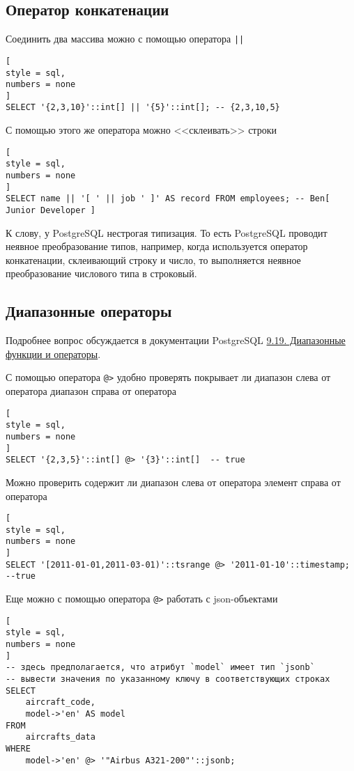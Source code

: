 \documentclass[%
	11pt,
	a4paper,
	utf8,
		]{article}
\begin{document}
\subsection{Оператор конкатенации}

Соединить два массива можно с помощью оператора \texttt{||} 
\begin{lstlisting}[
style = sql,
numbers = none
]
SELECT '{2,3,10}'::int[] || '{5}'::int[]; -- {2,3,10,5}
\end{lstlisting}

С помощью этого же оператора можно <<склеивать>> строки
\begin{lstlisting}[
style = sql,
numbers = none
]
SELECT name || '[ ' || job ' ]' AS record FROM employees; -- Ben[ Junior Developer ]
\end{lstlisting}

К слову, у PostgreSQL нестрогая типизация. То есть PostgreSQL проводит неявное преобразование типов, например, когда используется оператор конкатенации, склеивающий строку и число, то выполняется неявное преобразование числового типа в строковый.

\subsection{Диапазонные операторы}

Подробнее вопрос обсуждается в документации PostgreSQL \href{https://postgrespro.ru/docs/postgrespro/10/functions-range}{9.19. Диапазонные функции и операторы}.

С помощью оператора \verb|@>| удобно проверять покрывает ли диапазон слева от оператора диапазон справа от оператора
\begin{lstlisting}[
style = sql,
numbers = none
]
SELECT '{2,3,5}'::int[] @> '{3}'::int[]  -- true
\end{lstlisting}

Можно проверить содержит ли диапазон слева от оператора элемент справа от оператора
\begin{lstlisting}[
style = sql,
numbers = none
]
SELECT '[2011-01-01,2011-03-01)'::tsrange @> '2011-01-10'::timestamp;  --true
\end{lstlisting}

Еще можно с помощью оператора \texttt{@>} работать с json-объектами
\begin{lstlisting}[
style = sql,
numbers = none
]
-- здесь предполагается, что атрибут `model` имеет тип `jsonb`
-- вывести значения по указанному ключу в соответствующих строках
SELECT
    aircraft_code,
    model->'en' AS model
FROM
    aircrafts_data
WHERE
    model->'en' @> '"Airbus A321-200"'::jsonb;
\end{lstlisting}
\end{document}
